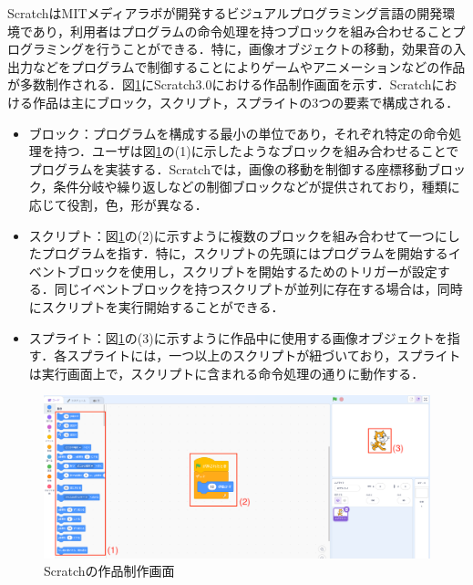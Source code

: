 \documentclass[T,J]{fose} %
\begin{document}
ScratchはMITメディアラボが開発するビジュアルプログラミング言語の開発環境であり，利用者はプログラムの命令処理を持つブロックを組み合わせることプログラミングを行うことができる．特に，画像オブジェクトの移動，効果音の入出力などをプログラムで制御することによりゲームやアニメーションなどの作品が多数制作される．図\ref{fig:Scratch-description}にScratch3.0における作品制作画面を示す．Scratchにおける作品は主にブロック，スクリプト，スプライトの3つの要素で構成される．
\begin{itemize}
\item ブロック：プログラムを構成する最小の単位であり，それぞれ特定の命令処理を持つ．ユーザは図\ref{fig:Scratch-description}の(1)に示したようなブロックを組み合わせることでプログラムを実装する．Scratchでは，画像の移動を制御する座標移動ブロック，条件分岐や繰り返しなどの制御ブロックなどが提供されており，種類に応じて役割，色，形が異なる．
\item スクリプト：図\ref{fig:Scratch-description}の(2)に示すように複数のブロックを組み合わせて一つにしたプログラムを指す．特に，スクリプトの先頭にはプログラムを開始するイベントブロックを使用し，スクリプトを開始するためのトリガーが設定する．同じイベントブロックを持つスクリプトが並列に存在する場合は，同時にスクリプトを実行開始することができる．
\item スプライト：図\ref{fig:Scratch-description}の(3)に示すように作品中に使用する画像オブジェクトを指す．各スプライトには，一つ以上のスクリプトが紐づいており，スプライトは実行画面上で，スクリプトに含まれる命令処理の通りに動作する．
\end{itemize}
\begin{figure}[t]
	\centering
	\includegraphics[width=1.0\linewidth]{Okamoto_fig/Scratch-description.pdf}
	\caption{Scratchの作品制作画面}
	\label{fig:Scratch-description}
\end{figure}
\end{document}
